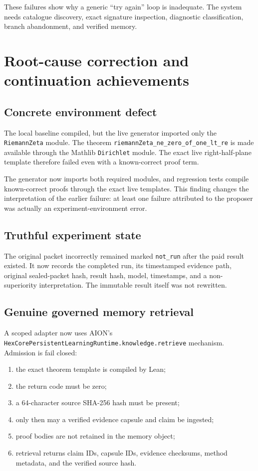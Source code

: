 \documentclass[11pt,a4paper]{article}
\newcommand{\code}[1]{\texttt{#1}}
\begin{document}
These failures show why a generic ``try again'' loop is inadequate. The system
needs catalogue discovery, exact signature inspection, diagnostic
classification, branch abandonment, and verified memory.

\section{Root-cause correction and continuation achievements}

\subsection{Concrete environment defect}

The local baseline compiled, but the live generator imported only the
\code{RiemannZeta} module. The theorem
\code{riemannZeta\_ne\_zero\_of\_one\_lt\_re} is made available through the
Mathlib \code{Dirichlet} module. The exact live right-half-plane template
therefore failed even with a known-correct proof term.

The generator now imports both required modules, and regression tests compile
known-correct proofs through the exact live templates. This finding changes the
interpretation of the earlier failure: at least one failure attributed to the
proposer was actually an experiment-environment error.

\subsection{Truthful experiment state}

The original packet incorrectly remained marked \code{not\_run} after the paid
result existed. It now records the completed run, its timestamped evidence
path, original sealed-packet hash, result hash, model, timestamps, and a
non-superiority interpretation. The immutable result itself was not rewritten.

\subsection{Genuine governed memory retrieval}

A scoped adapter now uses AION's
\code{HexCorePersistentLearningRuntime.knowledge.retrieve} mechanism. Admission
is fail closed:

\begin{enumerate}
  \item the exact theorem template is compiled by Lean;
  \item the return code must be zero;
  \item a 64-character source SHA-256 hash must be present;
  \item only then may a verified evidence capsule and claim be ingested;
  \item proof bodies are not retained in the memory object;
  \item retrieval returns claim IDs, capsule IDs, evidence checksums, method
  metadata, and the verified source hash.
\end{enumerate}
\end{document}
